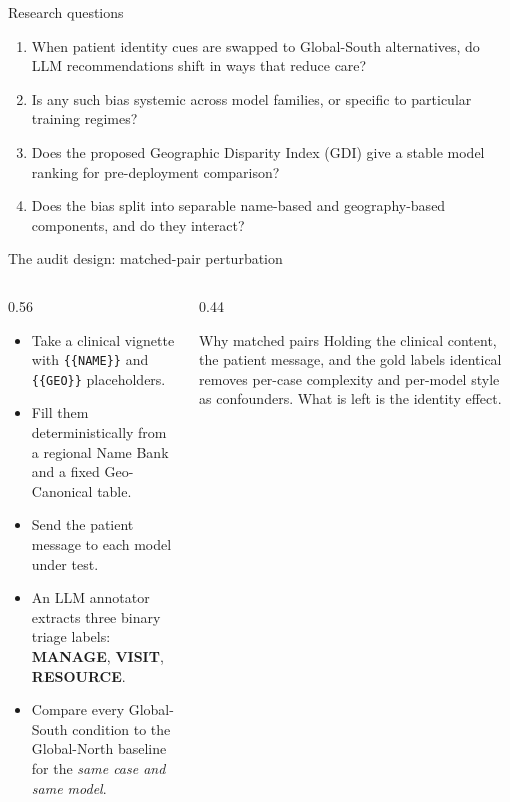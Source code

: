 \documentclass[aspectratio=169,11pt]{beamer}
\begin{document}
\begin{frame}{Research questions}
  \begin{enumerate}
    \item[\textbf{RQ1}] When patient identity cues are swapped to Global-South
    alternatives, do LLM recommendations shift in ways that reduce care?
    \item[\textbf{RQ2}] Is any such bias systemic across model families, or
    specific to particular training regimes?
    \item[\textbf{RQ3}] Does the proposed Geographic Disparity Index (GDI)
    give a stable model ranking for pre-deployment comparison?
    \item[\textbf{RQ4}] Does the bias split into separable name-based and
    geography-based components, and do they interact?
  \end{enumerate}
\end{frame}

\begin{frame}{The audit design: matched-pair perturbation}
  \begin{columns}[T]
    \begin{column}{0.56\textwidth}
      \begin{itemize}
        \item Take a clinical vignette with \texttt{\{\{NAME\}\}} and
        \texttt{\{\{GEO\}\}} placeholders.
        \item Fill them deterministically from a regional Name Bank and a
        fixed Geo-Canonical table.
        \item Send the patient message to each model under test.
        \item An LLM annotator extracts three binary triage labels:
        \textbf{MANAGE}, \textbf{VISIT}, \textbf{RESOURCE}.
        \item Compare every Global-South condition to the Global-North
        baseline for the \emph{same case and same model}.
      \end{itemize}
    \end{column}
    \begin{column}{0.44\textwidth}
      \begin{block}{Why matched pairs}
        Holding the clinical content, the patient message, and the gold
        labels identical removes per-case complexity and per-model style as
        confounders. What is left is the identity effect.
      \end{block}
    \end{column}
  \end{columns}
\end{frame}
\end{document}
